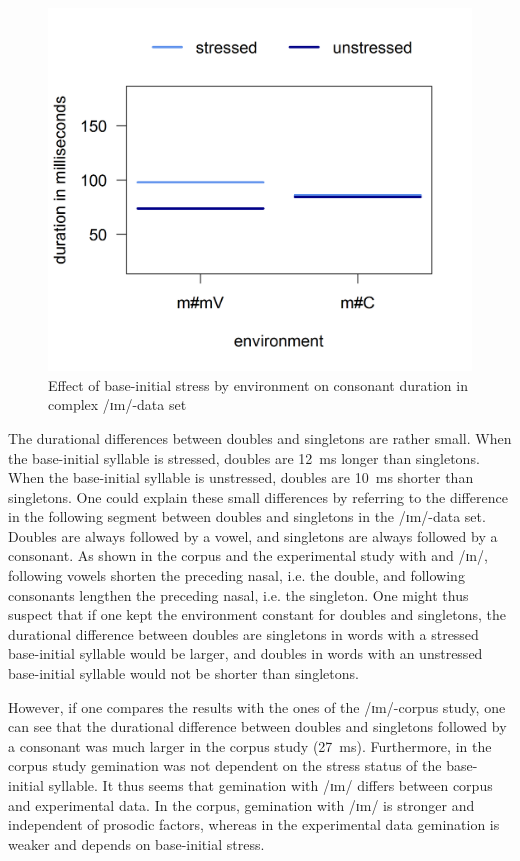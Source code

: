 \begin{figure} [h!]
 	\centering
 	\includegraphics [scale=0.5] {images/Experiment/imModelInterEnvStress}
 	\caption{Effect of base-initial stress by environment on consonant duration in complex /ɪm/-data set}
 	\label{fig:NumNasal imComplex experiment}
 	
 \end{figure}



The durational differences between doubles and singletons are rather small.  When the base-initial syllable is stressed, doubles are 12~ms longer than singletons. When the base-initial syllable is unstressed, doubles are 10~ms shorter than singletons. 
  One could explain these small differences by referring to the difference in the following segment between doubles and singletons in the /ɪm/-data set. Doubles are always followed by a vowel, and singletons are always followed by a consonant. As shown in the corpus and the experimental study with  and /ɪn/, following vowels shorten the preceding nasal, i.e. the double, and following consonants lengthen the preceding nasal, i.e. the singleton. One might thus suspect that if one kept the environment constant for doubles and singletons, the durational difference between doubles are singletons in words with a stressed base-initial syllable would be larger, and doubles in words with an unstressed base-initial syllable would not be shorter than singletons. 

However, if one compares the results with the ones of the /ɪm/-corpus study, one can see that the durational difference between doubles and singletons followed by a consonant was much larger in the corpus study (27~ms). Furthermore, in the corpus study gemination was not dependent on the stress status of the base-initial syllable.
It thus seems that gemination with /ɪm/ differs between corpus and experimental data. In the corpus, gemination with /ɪm/ is stronger and independent of prosodic factors, whereas in the experimental data gemination is weaker and depends on base-initial stress.


